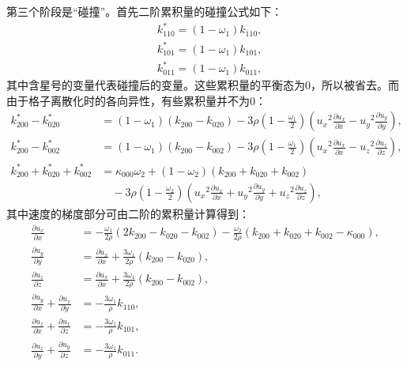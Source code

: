 第三个阶段是“碰撞”。首先二阶累积量的碰撞公式如下：
\begin{align*}
& k_{110}^{*}=\left(1-\omega_{1}\right) k_{110}, \\
& k_{101}^{*}=\left(1-\omega_{1}\right) k_{101}, \\
& k_{011}^{*}=\left(1-\omega_{1}\right) k_{011} ,
\end{align*}
其中含星号的变量代表碰撞后的变量。这些累积量的平衡态为0，所以被省去。而由于格子离散化时的各向异性，有些累积量并不为0：
\begin{align*}
k_{200}^{*}-k_{020}^{*} & =\left(1-\omega_{1}\right)\left(k_{200}-k_{020}\right)-3 \rho\left(1-\frac{\omega_{1}}{2}\right)\left({u_x}^{2} \frac{\partial u_x}{\partial x}-{u_y}^{2} \frac{\partial u_y}{\partial y}\right), \\
k_{200}^{*}-k_{002}^{*} & =\left(1-\omega_{1}\right)\left(k_{200}-k_{002}\right)-3 \rho\left(1-\frac{\omega_{1}}{2}\right)\left({u_x}^{2} \frac{\partial u_x}{\partial x}-{u_z}^{2} \frac{\partial u_z}{\partial z}\right), \\
k_{200}^{*}+k_{020}^{*}+k_{002}^{*} & =\kappa_{000} \omega_{2}+\left(1-\omega_{2}\right)\left(k_{200}+k_{020}+k_{002}\right) \\
&\quad -3 \rho\left(1-\frac{\omega_{2}}{2}\right)\left({u_x}^{2} \frac{\partial u_x}{\partial x}+{u_y}^{2} \frac{\partial u_y}{\partial y}+{u_z}^{2} \frac{\partial u_z}{\partial z}\right) ,
\end{align*}
其中速度的梯度部分可由二阶的累积量计算得到：
\begin{align*}
\frac{\partial u_x}{\partial x} & =-\frac{\omega_{1}}{2 \rho}\left(2 k_{200}-k_{020}-k_{002}\right)-\frac{\omega_{2}}{2 \rho}\left(k_{200}+k_{020}+k_{002}-\kappa_{000}\right), \\
\frac{\partial u_y}{\partial y} & =\frac{\partial u_x}{\partial x}+\frac{3 \omega_{1}}{2 \rho}\left(k_{200}-k_{020}\right), \\
\frac{\partial u_z}{\partial z} & =\frac{\partial u_x}{\partial x}+\frac{3 \omega_{1}}{2 \rho}\left(k_{200}-k_{002}\right), \\
\frac{\partial u_y}{\partial x}+\frac{\partial u_x}{\partial y} & =-\frac{3 \omega_{1}}{\rho} k_{110}, \\
\frac{\partial u_z}{\partial x}+\frac{\partial u_x}{\partial z} & =-\frac{3 \omega_{1}}{\rho} k_{101}, \\
\frac{\partial u_z}{\partial y}+\frac{\partial u_y}{\partial z} & =-\frac{3 \omega_{1}}{\rho} k_{011}.
\end{align*}
